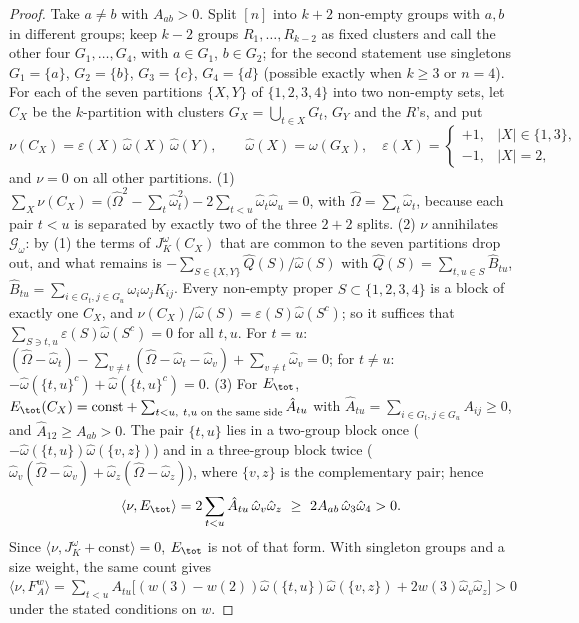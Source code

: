\begin{proof}
Take $a\ne b$ with $A_{ab}>0$. Split $[n]$ into $k+2$ non-empty groups with $a,b$ in different groups; keep $k-2$ groups $R_1,\dots,R_{k-2}$ as fixed clusters and call the other four $G_1,\dots,G_4$, with $a\in G_1$, $b\in G_2$; for the second statement use singletons $G_1=\{a\}$, $G_2=\{b\}$, $G_3=\{c\}$, $G_4=\{d\}$ (possible exactly when $k\ge3$ or $n=4$). For each of the seven partitions $\{X,Y\}$ of $\{1,2,3,4\}$ into two non-empty sets, let $C_X$ be the $k$-partition with clusters $G_X=\bigcup_{t\in X}G_t$, $G_Y$ and the $R$'s, and put
\[
\nu(C_X)=\varepsilon(X)\,\hat\omega(X)\,\hat\omega(Y),\qquad\hat\omega(X)=\omega(G_X),\quad\varepsilon(X)=\begin{cases}+1,&|X|\in\{1,3\},\\-1,&|X|=2,\end{cases}
\]
and $\nu=0$ on all other partitions. (1) $\sum_X\nu(C_X)=\bigl(\hat\Omega^2-\sum_t\hat\omega_t^2\bigr)-2\sum_{t<u}\hat\omega_t\hat\omega_u=0$, with $\hat\Omega=\sum_t\hat\omega_t$, because each pair $t<u$ is separated by exactly two of the three $2{+}2$ splits. (2) $\nu$ annihilates $\mathcal G_\omega$: by (1) the terms of $J^\omega_K(C_X)$ that are common to the seven partitions drop out, and what remains is $-\sum_{S\in\{X,Y\}}\hat Q(S)/\hat\omega(S)$ with $\hat Q(S)=\sum_{t,u\in S}\hat B_{tu}$, $\hat B_{tu}=\sum_{i\in G_t,j\in G_u}\omega_i\omega_jK_{ij}$. Every non-empty proper $S\subset\{1,2,3,4\}$ is a block of exactly one $C_X$, and $\nu(C_X)/\hat\omega(S)=\varepsilon(S)\hat\omega(S^c)$; so it suffices that $\sum_{S\ni t,u}\varepsilon(S)\hat\omega(S^c)=0$ for all $t,u$. For $t=u$: $(\hat\Omega-\hat\omega_t)-\sum_{v\ne t}(\hat\Omega-\hat\omega_t-\hat\omega_v)+\sum_{v\ne t}\hat\omega_v=0$; for $t\ne u$: $-\hat\omega(\{t,u\}^c)+\hat\omega(\{t,u\}^c)=0$. (3) For $E_\tot$, $E_\tot(C_X)=\mathrm{const}+\sum_{t<u,\ t,u\text{ on the same side}}\hat A_{tu}$ with $\hat A_{tu}=\sum_{i\in G_t,j\in G_u}A_{ij}\ge0$, and $\hat A_{12}\ge A_{ab}>0$. The pair $\{t,u\}$ lies in a two-group block once ($-\hat\omega(\{t,u\})\hat\omega(\{v,z\})$) and in a three-group block twice ($\hat\omega_v(\hat\Omega-\hat\omega_v)+\hat\omega_z(\hat\Omega-\hat\omega_z)$), where $\{v,z\}$ is the complementary pair; hence
\[
\langle\nu,E_\tot\rangle=2\sum_{t<u}\hat A_{tu}\,\hat\omega_v\hat\omega_z\ \ge\ 2A_{ab}\,\hat\omega_3\hat\omega_4>0 .
\]
Since $\langle\nu,J^\omega_K+\mathrm{const}\rangle=0$, $E_\tot$ is not of that form. With singleton groups and a size weight, the same count gives $\langle\nu,F^w_A\rangle=\sum_{t<u}A_{tu}\bigl[(w(3)-w(2))\hat\omega(\{t,u\})\hat\omega(\{v,z\})+2w(3)\hat\omega_v\hat\omega_z\bigr]>0$ under the stated conditions on $w$.
\end{proof}

